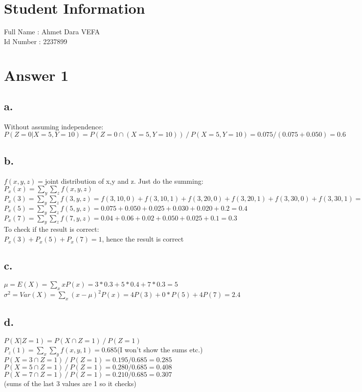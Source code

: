 \documentclass[12pt]{article}
\begin{document}
\section*{Student Information } 
Full Name : Ahmet Dara VEFA \\
Id Number : 2237899 \\

\section*{Answer 1}

\subsection*{a.}
Without assuming independence: \\
$P(Z=0 | X=5, Y=10)=P(Z=0 \cap (X=5,Y=10)) \ / \ P(X=5,Y=10) = 0.075/(0.075+0.050)=0.6$ \\ 

\subsection*{b.}
$f(x,y,z)=$joint distribution of x,y and z. Just do the summing: \\
$P_x(x)=\sum_y \sum_z f(x,y,z)$ \\
$P_x(3)=\sum_y \sum_z f(3,y,z)=f(3,10,0)+f(3,10,1) + f(3,20,0) + f(3,20,1)+f(3,30,0)+f(3,30,1)=0.025+0.025+0.03+0.02+0.05+0.15=0.3$ \\
$P_x(5)=\sum_y \sum_z f(5,y,z)=0.075+0.050+0.025+0.030+0.020+0.2=0.4$ \\
$P_x(7)=\sum_y \sum_z f(7,y,z)=0.04+0.06+0.02+0.050+0.025+0.1=0.3$ \\
To check if the result is correct: \\
$P_x(3)+P_x(5)+P_x(7)=1$, hence the result is correct
\subsection*{c.}
$\mu=E(X)=\sum_x xP(x)=3*0.3+5*0.4+7*0.3=5 $ \\
$\sigma^2=Var(X)=\sum_x (x-\mu)^2P(x)=4P(3)+0*P(5)+4P(7)=2.4  $ \\
\subsection*{d.}
$P(X|Z=1)=P(X \cap Z=1) \ / \ P(Z=1)  $ \\
$P_z(1)=\sum_x \sum_y f(x,y,1)=0.685  $(I won't show the sums etc.) \\
$P(X=3 \cap Z=1)\ / \ P(Z=1)=0.195/0.685=0.285  $ \\
$P(X=5 \cap Z=1)\ / \ P(Z=1)=0.280/0.685=0.408 $ \\
$P(X=7 \cap Z=1)\ / \ P(Z=1)=0.210/0.685=0.307 $ \\(sums of the last 3 values are 1 so it checks)
\end{document}
